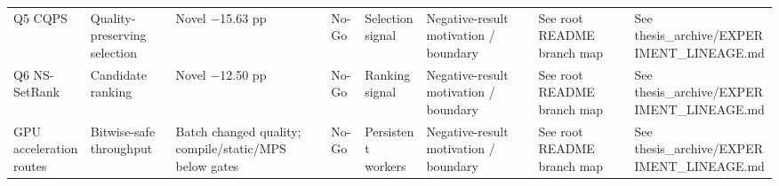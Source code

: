 \begin{tabular}{llllllll}
Q5 CQPS & Quality-preserving selection & Novel −15.63 pp & No-Go & Selection signal & Negative-result motivation / boundary & See root README branch map & See thesis\_archive/EXPERIMENT\_LINEAGE.md \\
Q6 NS-SetRank & Candidate ranking & Novel −12.50 pp & No-Go & Ranking signal & Negative-result motivation / boundary & See root README branch map & See thesis\_archive/EXPERIMENT\_LINEAGE.md \\
GPU acceleration routes & Bitwise-safe throughput & Batch changed quality; compile/static/MPS below gates & No-Go & Persistent workers & Negative-result motivation / boundary & See root README branch map & See thesis\_archive/EXPERIMENT\_LINEAGE.md \\
\bottomrule
\end{tabular}
